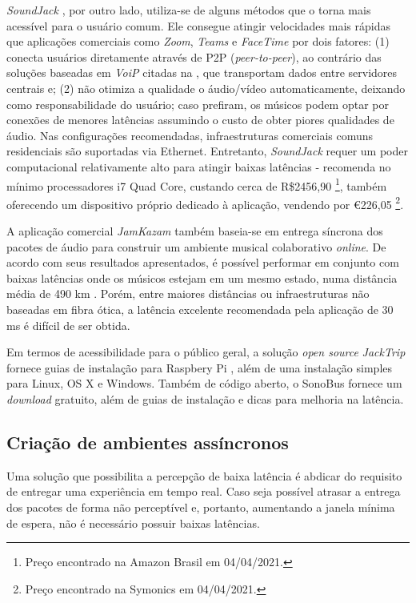 \textit{SoundJack} \cite{soundjack}, por outro lado, utiliza-se de alguns métodos que o torna mais acessível para o usuário comum. Ele consegue atingir velocidades mais rápidas que aplicações comerciais como \textit{Zoom}, \textit{Teams} e \textit{FaceTime} por dois fatores: (1) conecta usuários diretamente através de P2P (\textit{peer-to-peer}), ao contrário das soluções baseadas em \textit{VoiP} citadas na , que transportam dados entre servidores centrais e; (2) não otimiza a qualidade o áudio/vídeo automaticamente, deixando como responsabilidade do usuário; caso prefiram, os músicos podem optar por conexões de menores latências assumindo o custo de obter piores qualidades de áudio. Nas configurações recomendadas, infraestruturas comerciais comuns residenciais são suportadas via Ethernet. Entretanto, \textit{SoundJack} requer um poder computacional relativamente alto para atingir baixas latências - recomenda no mínimo processadores i7 Quad Core, custando cerca de R\$2456,90 \footnote{Preço encontrado na Amazon Brasil em 04/04/2021.}, também oferecendo um dispositivo próprio dedicado à aplicação, vendendo por €226,05 \footnote{Preço encontrado na Symonics em 04/04/2021.}.

A aplicação comercial \textit{JamKazam} \cite{jamkazam} também baseia-se em entrega síncrona dos pacotes de áudio para construir um ambiente musical colaborativo \textit{online}. De acordo com seus resultados apresentados, é possível performar em conjunto com baixas latências onde os músicos estejam em um mesmo estado, numa distância média de 490 km \cite{jamkazam_video}. Porém, entre maiores distâncias ou infraestruturas não baseadas em fibra ótica, a latência excelente recomendada pela aplicação de 30 ms \cite{jamkazam_latencies} é difícil de ser obtida.

Em termos de acessibilidade para o público geral, a solução \textit{open source} \textit{JackTrip} fornece guias de instalação para Raspbery Pi \cite{jacktrip_rasp}, além de uma instalação simples para Linux, OS X e Windows. Também de código aberto, o SonoBus \cite{sonobus} fornece um \textit{download} gratuito, além de guias de instalação e dicas para melhoria na latência.

\subsection{Criação de ambientes assíncronos}

Uma solução que possibilita a percepção de baixa latência é abdicar do requisito de entregar uma experiência em tempo real. Caso seja possível atrasar a entrega dos pacotes de forma não perceptível e, portanto, aumentando a janela mínima de espera, não é necessário possuir baixas latências.

